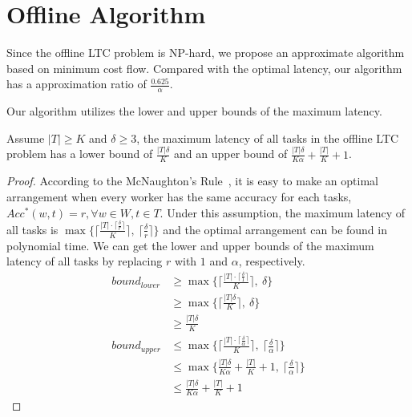\section{Offline Algorithm}
\label{sec:offline}
Since the offline LTC problem is NP-hard, we propose an approximate algorithm based on minimum cost flow.
Compared with the optimal latency, our algorithm has a approximation ratio of $\frac{0.625}{\alpha}$.

Our algorithm utilizes the lower and upper bounds of the maximum latency.

\begin{theorem}
\label{thm:boundOfLTC}
Assume $|T| \ge K$ and $\delta \ge 3$, the maximum latency of all tasks in the offline LTC problem has a lower bound of $\frac{|T|\delta}{K}$ and an upper bound of $\frac{|T|\delta}{K\alpha} + \frac{|T|}{K} + 1$.
\end{theorem}

\begin{proof}
According to the McNaughton's Rule~\cite{NaughtonRule}, it is easy to make an optimal arrangement when every worker has the same accuracy for each tasks, \ie $Acc^{*}(w, t) = r, \forall w \in W, t \in T$.
Under this assumption, the maximum latency of all tasks is $\max\{\lceil \frac{|T| \cdot \lceil \frac{\delta}{r} \rceil}{K} \rceil,\ \lceil \frac{\delta}{r} \rceil\}$ and the optimal arrangement can be found in polynomial time.
We can get the lower and upper bounds of the maximum latency of all tasks by replacing $r$ with $1$ and $\alpha$, respectively.
\begin{align*}
	bound_{lower} &\ge \max\{\lceil \frac{|T| \cdot \lceil \frac{\delta}{1} \rceil}{K} \rceil,\ \delta\} \\
					&\ge \max\{\lceil \frac{|T|\delta}{K} \rceil,\ \delta \} \\
					&\ge \frac{|T|\delta}{K}  \\
	bound_{upper} &\le \max\{\lceil \frac{|T| \cdot \lceil \frac{\delta}{\alpha} \rceil}{K} \rceil,\ \lceil \frac{\delta}{\alpha} \rceil\} \\
					&\le \max\{ \frac{|T|\delta}{K\alpha} + \frac{|T|}{K} + 1,\ \lceil \frac{\delta}{\alpha} \rceil\} \\
					&\le \frac{|T|\delta}{K\alpha} + \frac{|T|}{K} + 1
\end{align*}
\end{proof}

